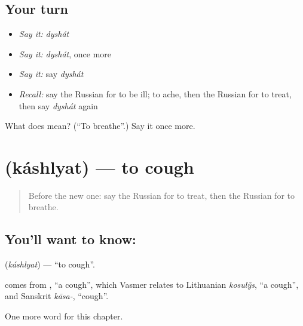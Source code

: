 \subsection*{Your turn}
\begin{itemize}
\raggedright
  \item \emph{Say it:} \emph{dyshát}
  \item \emph{Say it:} \emph{dyshát}, once more
  \item \emph{Say it:} say \emph{dyshát}
  \item \emph{Recall:} say the Russian for to be ill; to ache, then the Russian for to treat, then say \emph{dyshát} again
\end{itemize}

\begin{tcolorbox}[breakable,colback=teal!4,colframe=teal!35!black,title={Before you move on}]
What does  mean? (\textquotedblleft{}To breathe\textquotedblright{}.) Say it once more.
\end{tcolorbox}
\section[\texorpdfstring{\ru{кашлять} (káshlyat)}{кашлять (káshlyat)}]{ (káshlyat) — to cough}

\label{lesson:RU-C207-kashlyat}



\begin{quote}
Before the new one: say the Russian for to treat, then the Russian for to breathe.
\end{quote}

\subsection*{You'll want to know: }
\textbf{} (\emph{káshlyat}) — \textquotedblleft{}to cough\textquotedblright{}.

\begin{cousinweb}
\textbf{} comes from \emph{}, \textquotedblleft{}a cough\textquotedblright{}, which Vasmer relates to Lithuanian \emph{kosulỹs}, \textquotedblleft{}a cough\textquotedblright{}, and Sanskrit \emph{kāsa-}, \textquotedblleft{}cough\textquotedblright{}.
\end{cousinweb}

\begin{grammarlens}[title={What you've built}]
One more word for this chapter.
\end{grammarlens}

